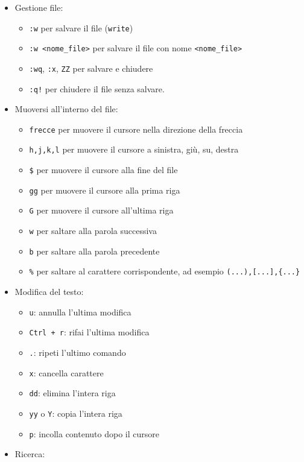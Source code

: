  \begin{itemize}
 	\item Gestione file:
 		\begin{itemize}
 			\item \verb*|:w| per salvare il file (\verb*|write|)
 			\item \verb*|:w <nome_file>| per salvare il file con nome \verb*|<nome_file>|
 			\item \verb*|:wq|, \verb*|:x|, \verb*|ZZ| per salvare e chiudere
 			\item \verb*|:q!| per chiudere il file senza salvare.
 		\end{itemize}
 	\item Muoversi all'interno del file:
 		\begin{itemize}
 			\item \verb*|frecce| per muovere il cursore nella direzione della freccia
 			\item \verb*|h,j,k,l| per muovere il cursore a sinistra, giù, su, destra
 			\item \verb*|$| per muovere il cursore alla fine del file
 			\item \verb*|gg| per muovere il cursore alla prima riga
 			\item \verb*|G| per muovere il cursore all'ultima riga
 			\item \verb*|w| per saltare alla parola successiva
 			\item \verb*|b| per saltare alla parola precedente
 			\item \verb*|%| per saltare al carattere corrispondente, ad esempio \verb*|(...),[...],{...}|
 		\end{itemize}
 	\item Modifica del testo:
 		\begin{itemize}
 			\item \verb*|u|: annulla l'ultima modifica
 			\item \verb*|Ctrl + r|: rifai l'ultima modifica
 			\item \verb*|.|: ripeti l'ultimo comando
 			\item \verb*|x|: cancella carattere
 			\item \verb*|dd|: elimina l'intera riga
 			\item \verb*|yy| o \verb*|Y|: copia l'intera riga
 			\item \verb*|p|: incolla contenuto dopo il cursore
 		\end{itemize}
 	\item Ricerca:
 		\begin{itemize}

\end{itemize}
\end{itemize}
